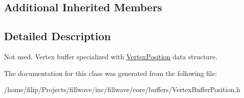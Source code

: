 \subsection*{Additional Inherited Members}


\subsection{Detailed Description}
Not used. Vertex buffer specialized with \hyperlink{structflw_1_1flc_1_1VertexPosition}{Vertex\+Position} data structure. 

The documentation for this class was generated from the following file\+:\begin{DoxyCompactItemize}
\item 
/home/filip/\+Projects/fillwave/inc/fillwave/core/buffers/Vertex\+Buffer\+Position.\+h\end{DoxyCompactItemize}
